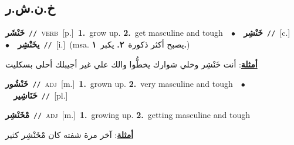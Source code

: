 \documentclass[10pt,a4paper,twoside]{article} %
\begin{document}
\begin{multicols}{2}
\vspace{-3mm}
\subsection*{\color{blue}\foreignlanguage{arabic}{خ.ن.ش.ر}\color{blue}{}} 

{\setlength\topsep{0pt}\textbf{\foreignlanguage{arabic}{خَنْشَر}}\ {\color{gray}\texttt{//}\color{black}}\ \textsc{verb}\ [p.]\ \textbf{1.}~grow up.  \textbf{2.}~get masculine and tough\ \ $\bullet$\ \ \setlength\topsep{0pt}\textbf{\foreignlanguage{arabic}{خَنْشِر}}\ {\color{gray}\texttt{//}\color{black}}\ [c.]\ \ $\bullet$\ \ \setlength\topsep{0pt}\textbf{\foreignlanguage{arabic}{يخَنْشِر}}\ {\color{gray}\texttt{//}\color{black}}\ [i.]\ \color{gray}(msa. \foreignlanguage{arabic}{يصبح أكثر ذكورة}~\foreignlanguage{arabic}{\textbf{٢.}}  \foreignlanguage{arabic}{يكبر}~\foreignlanguage{arabic}{\textbf{١.}})\color{black}\  \begin{flushright}\color{gray}\foreignlanguage{arabic}{\textbf{\underline{\foreignlanguage{arabic}{أمثلة}}}: أنت خَنْشِر وخلي شوارك يخطُّوا والك علي غير أجيبلك أحلى بسكليت}\end{flushright}\color{black}} \vspace{2mm}

{\setlength\topsep{0pt}\textbf{\foreignlanguage{arabic}{خَنْشُور}}\ {\color{gray}\texttt{//}\color{black}}\ \textsc{adj}\ [m.]\ \textbf{1.}~grown up.  \textbf{2.}~very masculine and tough\ \ $\bullet$\ \ \setlength\topsep{0pt}\textbf{\foreignlanguage{arabic}{خَنَاشِير}}\ {\color{gray}\texttt{//}\color{black}}\ [pl.]\ } \vspace{2mm}

{\setlength\topsep{0pt}\textbf{\foreignlanguage{arabic}{مْخَنْشِر}}\ {\color{gray}\texttt{//}\color{black}}\ \textsc{adj}\ [m.]\ \textbf{1.}~growing up.  \textbf{2.}~getting masculine and tough\  \begin{flushright}\color{gray}\foreignlanguage{arabic}{\textbf{\underline{\foreignlanguage{arabic}{أمثلة}}}: آخر مرة شفته كان مْخَنْشِر كثير}\end{flushright}\color{black}} \vspace{2mm}


\end{multicols}
\end{document}
